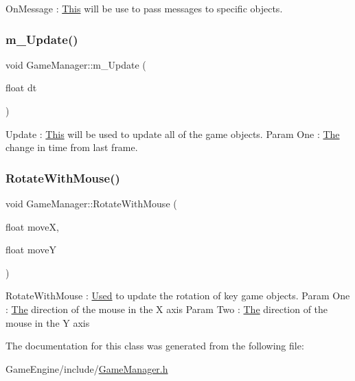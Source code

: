 On\+Message \+: \mbox{\hyperlink{class_this}{This}} will be use to pass messages to specific objects. \mbox{\label{class_game_manager_ab81eadbd42345b53241d33f584ca5ac5}} 
\subsubsection{\texorpdfstring{m\+\_\+\+Update()}{m\_Update()}}
{\footnotesize\ttfamily void Game\+Manager\+::m\+\_\+\+Update (\begin{DoxyParamCaption}\item[{float}]{dt }\end{DoxyParamCaption})\hspace{0.3cm}{\ttfamily [inline]}}

Update \+: \mbox{\hyperlink{class_this}{This}} will be used to update all of the game objects. Param One \+: \mbox{\hyperlink{class_the}{The}} change in time from last frame. \mbox{\label{class_game_manager_a53dfb2a166bbe26b9f5191973d40938e}} 
\subsubsection{\texorpdfstring{Rotate\+With\+Mouse()}{RotateWithMouse()}}
{\footnotesize\ttfamily void Game\+Manager\+::\+Rotate\+With\+Mouse (\begin{DoxyParamCaption}\item[{float}]{moveX,  }\item[{float}]{moveY }\end{DoxyParamCaption})\hspace{0.3cm}{\ttfamily [inline]}}

Rotate\+With\+Mouse \+: \mbox{\hyperlink{class_used}{Used}} to update the rotation of key game objects. Param One \+: \mbox{\hyperlink{class_the}{The}} direction of the mouse in the X axis Param Two \+: \mbox{\hyperlink{class_the}{The}} direction of the mouse in the Y axis 

The documentation for this class was generated from the following file\+:\begin{DoxyCompactItemize}
\item 
Game\+Engine/include/\mbox{\hyperlink{_game_manager_8h}{Game\+Manager.\+h}}\end{DoxyCompactItemize}
